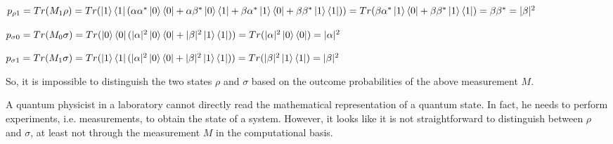 \documentclass[12pt]{article}
\begin{document}
\begin{enumerate}
          $p_{\rho1} = Tr(M_1\rho) = Tr(\ket{1}\bra{1}(\alpha\alpha^*\ket{0}\bra{0}+
              \alpha\beta^*\ket{0}\bra{1}+\beta\alpha^*\ket{1}\bra{0}+\beta\beta^*\ket{1}\bra{1})) = Tr(\beta\alpha^*\ket{1}\bra{0}+\beta\beta^*\ket{1}\bra{1}) = \beta\beta^* = |\beta|^2$

          $p_{\sigma0} = Tr(M_0\sigma) = Tr(\ket{0}\bra{0}(|\alpha|^2\ket{0}\bra{0}+|\beta|^2\ket{1}\bra{1})) = Tr(|\alpha|^2\ket{0}\bra{0}) = |\alpha|^2$

          $p_{\sigma1} = Tr(M_1\sigma) = Tr(\ket{1}\bra{1}(|\alpha|^2\ket{0}\bra{0}+|\beta|^2\ket{1}\bra{1})) = Tr(|\beta|^2\ket{1}\bra{1}) = |\beta|^2$

          So, it is impossible to distinguish the two states $\rho$ and $\sigma$ based on the outcome probabilities of the above measurement $M$.

          \vspace{\dimexpr\itemsep+\baselineskip}
\end{enumerate}

A quantum physicist in a laboratory cannot directly read the mathematical representation of a quantum state. In fact, he needs to perform experiments, i.e. measurements, to obtain the state of a system. However, it looks like it is not straightforward to distinguish between $\rho$ and $\sigma$, at least not through the measurement $M$ in the computational basis.
\end{document}
